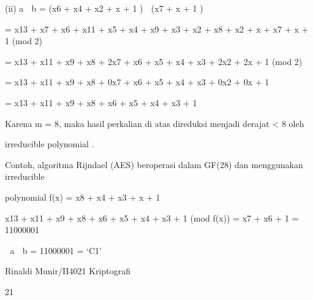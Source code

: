 \documentclass{article}
\begin{document}

(ii) a  b = (x6 + x4 + x2 + x + 1 )  (x7 + x + 1 )  

                 = x13 + x7 + x6 + x11 + x5 + x4 + x9 + x3 + x2 + x8 + x2 + x + x7 + x + 1 (mod 2)


    = x13 + x11 + x9 + x8 + 2x7 + x6 + x5 + x4 + x3 + 2x2 + 2x + 1 (mod 2) 


    = x13 + x11 + x9 + x8 + 0x7 + x6 + x5 + x4 + x3 + 0x2 + 0x + 1 

                = x13 + x11 + x9 + x8 + x6 + x5 + x4 + x3 + 1  


   Karena m = 8, maka hasil perkalian di atas direduksi menjadi derajat < 8 oleh 

 irreducible polynomial . 

   Contoh, algoritma Rijndael (AES) beroperasi dalam GF(28) dan menggunakan irreducible 

polynomial f(x) = x8 +  x4 +  x3 + x + 1 

  x13 + x11 + x9 + x8 + x6 + x5 + x4 + x3 + 1 (mod f(x)) = x7 + x6 + 1  = 11000001




  a  b = 11000001 = ‘C1’ 


Rinaldi Munir/II4021 Kriptografi

21
\end{document}
